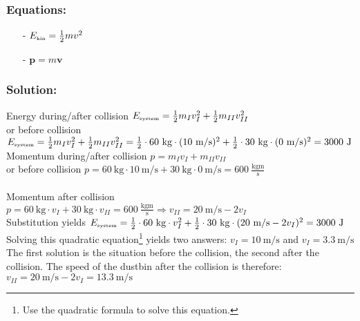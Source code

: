 \subsubsection*{Equations:}
\begin{itemize}
\item[-] $E_{\begin{tiny}\mbox{kin}\end{tiny}}=\frac{1}{2}mv^2$
\item[-] $\textbf{p}=m\textbf{v}$
\end{itemize}

\subsubsection*{Solution:}
\begin{doublespace}
Energy during/after collision $E_{\begin{tiny}\mbox{system}\end{tiny}}=\frac{1}{2}m_I v_I^2 + \frac{1}{2}m_{II} v_{II}^2$\\
or before collision $E_{\begin{tiny}\mbox{system}\end{tiny}}=\frac{1}{2}m_I v_I^2 + \frac{1}{2}m_{II} v_{II}^2 =\frac{1}{2} \cdot 60~\mbox{kg} \cdot (10~\mbox{m/s})^2 + \frac{1}{2} \cdot 30~\mbox{kg} \cdot (0~\mbox{m/s})^2 = 3000~\mbox{J}$\\
Momentum during/after collision $p=m_I v_I + m_{II} v_{II}$\\
or before collision $p=60~\mbox{kg} \cdot 10~\mbox{m/s} + 30~\mbox{kg} \cdot 0~\mbox{m/s} = 600~\frac{\mbox{kgm}}{\mbox{s}}$\\ \\
Momentum after collision $p=60~\mbox{kg} \cdot v_I + 30~\mbox{kg} \cdot v_{II} = 600~\frac{\mbox{kgm}}{\mbox{s}} \Longrightarrow v_{II} = 20~\mbox{m/s} - 2v_I$  \\
Substitution yields $E_{\begin{tiny}\mbox{system}\end{tiny}}=\frac{1}{2} \cdot 60~\mbox{kg} \cdot v_I^2 + \frac{1}{2} \cdot 30~\mbox{kg} \cdot (20~\mbox{m/s} - 2v_I)^2 = 3000~\mbox{J}$\\
Solving this quadratic equation\footnote{Use the quadratic formula to solve this equation.} yields two answers: $v_I=10~\mbox{m/s}$ and $v_I=3.3~\mbox{m/s}$\\
The first solution is the situation before the collision, the second after the collision. The speed of the dustbin after the collision is therefore: $v_{II}=20~\mbox{m/s} - 2v_{I}=13.3~\mbox{m/s}$
\end{doublespace}


